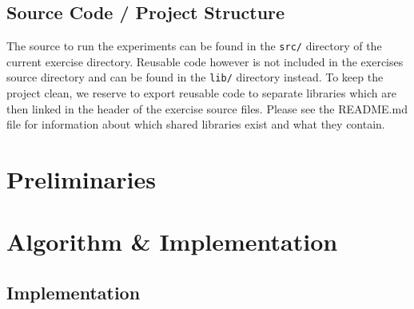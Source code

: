 \documentclass[twocolumn]{article}
\begin{document}
\subsection{Source Code / Project Structure}
The source to run the experiments can be found in the \texttt{src/} directory of the current exercise directory. 
Reusable code however is not included in the exercises source directory and can be found in the \texttt{lib/} directory instead. 
To keep the project clean, we reserve to export reusable code to separate libraries which are then linked in the header of the exercise source files. 
Please see the README.md file for information about which shared libraries exist and what they contain.

\section{Preliminaries}


\section{Algorithm \& Implementation}

\subsection{Implementation}
\end{document}
